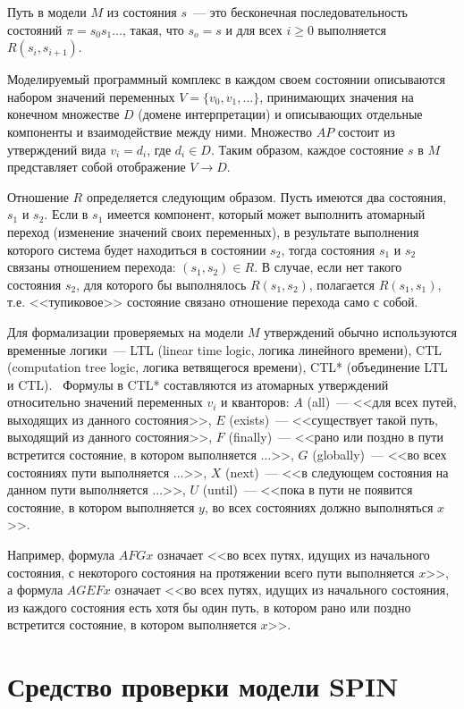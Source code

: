 \documentclass[12pt,a4paper,fleqn]{article}
\begin{document}
Путь в модели $M$ из состояния $s$~--- это бесконечная последовательность состояний $\pi = s_0 s_1 \ldots$, такая, что
$s_o = s$ и для всех $i \geq 0$ выполняется $R(s_i, s_{i+1})$.

Моделируемый программный комплекс в каждом своем состоянии описываются набором значений переменных $V = \{v_0, v_1,
\ldots\}$, принимающих значения на конечном множестве $D$ (домене интерпретации) и описывающих отдельные компоненты и
взаимодействие между ними. Множество $AP$ состоит из утверждений вида $v_i = d_i$, где $d_i \in D$. Таким образом,
каждое состояние $s$ в $M$ представляет собой отображение $V \rightarrow D$.

Отношение $R$ определяется следующим образом. Пусть имеются два состояния, $s_1$ и $s_2$. Если в $s_1$ имеется
компонент, который может выполнить атомарный переход (изменение значений своих переменных), в результате выполнения
которого система будет находиться в состоянии $s_2$, тогда состояния $s_1$ и $s_2$ связаны отношением перехода: $(s_1,
s_2) \in R$. В случае, если нет такого состояния $s_2$, для которого бы выполнялось $R(s_1, s_2)$, полагается $R(s_1,
s_1)$, т.е. <<тупиковое>> состояние связано отношение перехода само с собой.

Для формализации проверяемых на модели $M$ утверждений обычно используются временные логики~--- LTL (linear time logic,
логика линейного времени), CTL (computation tree logic, логика ветвящегося времени), CTL* (объединение LTL и
CTL).~\cite{Clarke, Velder} Формулы в CTL* составляются из атомарных утверждений относительно значений переменных $v_i$
и кванторов: $A$ (all)~--- <<для всех путей, выходящих из данного состояния>>, $E$ (exists)~--- <<существует такой путь,
выходящий из данного состояния>>, $F$ (finally)~--- <<рано или поздно в пути встретится состояние, в котором выполняется
...>>, $G$ (globally)~--- <<во всех состояниях пути выполняется ...>>, $X$ (next)~--- <<в следующем состояния на данном
пути выполняется ...>>, $U$ (until)~--- <<пока в пути не появится состояние, в котором выполняется $y$, во всех
состояниях должно выполняться $x$>>.

Например, формула $AFG x$ означает <<во всех путях, идущих из начального состояния, с некоторого состояния на протяжении всего
пути выполняется $x$>>, а формула $AGEF x$ означает <<во всех путях, идущих из начального состояния, из каждого состояния есть хотя бы
один путь, в котором рано или поздно встретится состояние, в котором выполняется $x$>>.

\section{Средство проверки модели SPIN}
\label{sec:spin}
\end{document}
